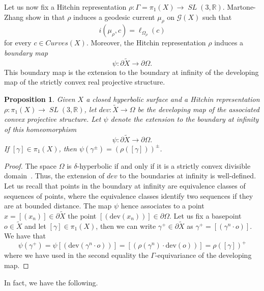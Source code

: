 \documentclass[12pt,article]{amsart}
\numberwithin{equation}{section}
\numberwithin{figure}{section}
\newtheorem{proposition}[equation]{Proposition}
\theoremstyle{definition}
\theoremstyle{plain}
\newcommand\dev{\ensuremath{\mathit{dev}}}
\newcommand\R{\ensuremath{\mathbb{R}}}
\newcommand{\del}{\partial}
\newcommand*{\wt}[1]{\widetilde{#1}}
\DeclareMathOperator{\SL}{\mathit{SL}}
\newcommand{\Curves}{\mathit{Curves}}
\begin{document}
Let us now fix a Hitchin representation $\rho \colon \Gamma=\pi_1(X) \to \SL(3, \R)$. Martone-Zhang show in \cite{MZ19:PositivelyRatioed} that $\rho$ induces a geodesic current $\mu_\rho$ on $\mathcal{G}(X)$ such that
\[
i(\mu_\rho , c) = \ell_{\Omega_\rho} (c)
\]
for every $c \in \Curves(X)$.
 Moreover, the Hitchin representation $\rho$ induces a \emph{boundary map}
 \[
 \psi \colon \partial \wt{X} \to \partial \Omega.
 \]
 This boundary map is the extension to the boundary at infinity of the developing map of the strictly convex real projective structure. 
 
 \begin{proposition}
 Given $X$ a closed hyperbolic surface and a Hitchin representation $\rho \colon \pi_1(X) \to \SL(3,\mathbb{R})$, let $\dev \colon \wt{X} \to \Omega$ be the developing map of the associated convex projective structure.
 Let $\psi$ denote the extension to the boundary at infinity of this homeomorphism
 \[
 \psi \colon \partial \wt{X} \to \partial \Omega.
 \]
 If $[\gamma] \in \pi_1(X)$, then $\psi(\gamma^{\pm})=(\rho([\gamma]))^{\pm}$. 
 \label{prop:samemaps}
 \end{proposition}
 \begin{proof}
  The space $\Omega$ is $\delta$-hyperbolic if and only if it is a strictly convex divisible domain~\cite[Theorem~4.5]{Ben04:Convexes}. Thus, the extension of $\dev$ to the boundaries at infinity is well-defined.
  Let us recall that points in the boundary at infinity are equivalence classes of sequences of points, where the equivalence classes identify two sequences if they are at bounded distance. The map $\psi$ hence associates to a point $x = [(x_n)] \in \del \wt{X}$ the point $[(\mathrm{dev}(x_n))] \in \del \Omega$. Let us fix a basepoint $o \in \wt{X}$ and let $[\gamma] \in \pi_1 (X)$, then we can write $\gamma^+ \in \del \wt{X}$ as $\gamma^+ = [ {(\gamma^n \cdot o )}]$. We have that
\[
      \psi (\gamma^+) = \psi [ ( \mathrm{dev} (\gamma^n \cdot o ) )] = [ (\rho (\gamma^n) \cdot \mathrm{dev}(o) ) ] = \rho ([\gamma])^+
\]
where we have used in the second equality the $\Gamma$-equivariance of the developing map.
 \end{proof}

 In fact, we have the following.
 
\end{document}
